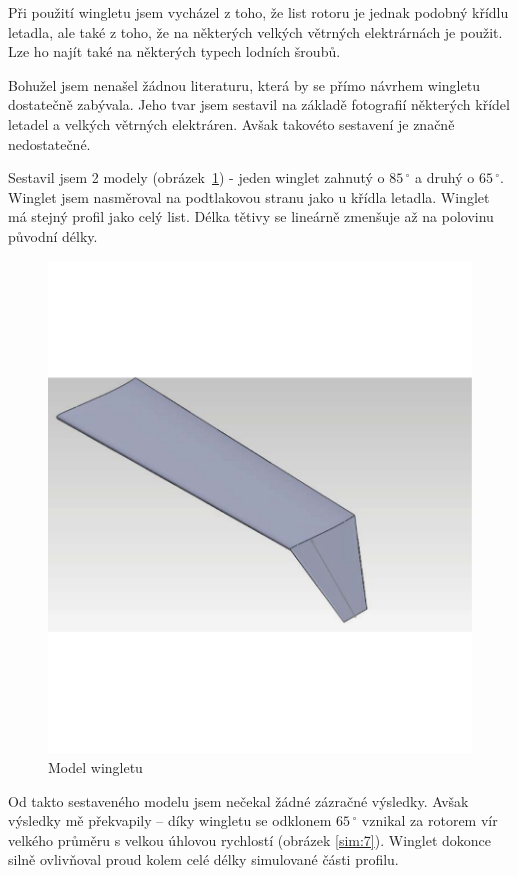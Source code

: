Při použití wingletu jsem vycházel z toho, že list rotoru je jednak podobný křídlu letadla, ale také z toho, že na některých velkých větrných elektrárnách je použit. Lze ho najít také na některých typech lodních šroubů.

Bohužel jsem nenašel žádnou literaturu, která by se přímo návrhem wingletu dostatečně zabývala. Jeho tvar jsem sestavil na základě fotografií některých křídel letadel a velkých větrných elektráren. Avšak takovéto sestavení je značně nedostatečné.

Sestavil jsem 2 modely (obrázek~\ref{konec:2}) - jeden winglet zahnutý o $85\,^{\circ}$ a druhý o $65\,^{\circ}$. Winglet jsem nasměroval na podtlakovou stranu jako u křídla letadla. Winglet má stejný profil jako celý list. Délka tětivy se lineárně zmenšuje až na polovinu původní délky.

\begin{figure}[H]
	\centering
	\includegraphics[]{obrazky/simulace/konec2p}
	\caption{Model wingletu}
	\label{konec:2}
\end{figure}
Od takto sestaveného modelu jsem nečekal žádné zázračné výsledky. Avšak výsledky mě překvapily – díky wingletu se odklonem $65\,^{\circ}$ vznikal za rotorem vír velkého průměru s velkou úhlovou rychlostí (obrázek \ref{sim:7}). Winglet dokonce silně ovlivňoval proud kolem celé délky simulované části profilu.

